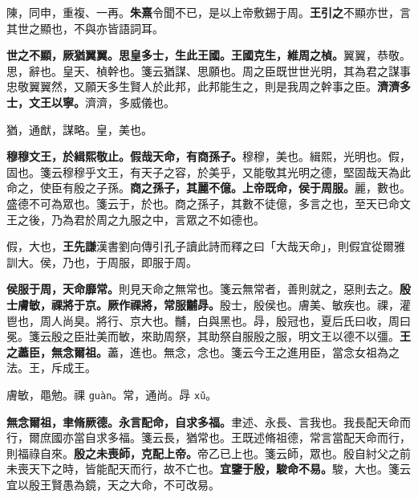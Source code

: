 \begin{quoting}陳，同申，重複、一再。\textbf{朱熹}令聞不已，是以上帝敷錫于周。\textbf{王引之}不顯亦世，言其世之顯也，不與亦皆語詞耳。\end{quoting}

\textbf{世之不顯，厥猶翼翼。思皇多士，生此王國。王國克生，維周之楨。}{\footnotesize 翼翼，恭敬。思，辭也。皇天、楨幹也。箋云猶謀、思願也。周之臣既世世光明，其為君之謀事忠敬翼翼然，又願天多生賢人於此邦，此邦能生之，則是我周之幹事之臣。}\textbf{濟濟多士，文王以寧。}{\footnotesize 濟濟，多威儀也。}

\begin{quoting}猶，通猷，謀略。皇，美也。\end{quoting}

\textbf{穆穆文王，於緝熙敬止。假哉天命，有商孫子。}{\footnotesize 穆穆，美也。緝熙，光明也。假，固也。箋云穆穆乎文王，有天子之容，於美乎，又能敬其光明之德，堅固哉天為此命之，使臣有殷之子孫。}\textbf{商之孫子，其麗不億。上帝既命，侯于周服。}{\footnotesize 麗，數也。盛德不可為眾也。箋云于，於也。商之孫子，其數不徒億，多言之也，至天已命文王之後，乃為君於周之九服之中，言眾之不如德也。}

\begin{quoting}假，大也，\textbf{王先謙}漢書劉向傳引孔子讀此詩而釋之曰「大哉天命」，則假宜從爾雅訓大。侯，乃也，于周服，即服于周。\end{quoting}

\textbf{侯服于周，天命靡常。}{\footnotesize 則見天命之無常也。箋云無常者，善則就之，惡則去之。}\textbf{殷士膚敏，祼將于京。厥作祼將，常服黼冔。}{\footnotesize 殷士，殷侯也。膚美、敏疾也。祼，灌鬯也，周人尚臭。將行、京大也。黼，白與黑也。冔，殷冠也，夏后氏曰收，周曰冕。箋云殷之臣壯美而敏，來助周祭，其助祭自服殷之服，明文王以德不以彊。}\textbf{王之藎臣，無念爾祖。}{\footnotesize 藎，進也。無念，念也。箋云今王之進用臣，當念女祖為之法。王，斥成王。}

\begin{quoting}膚敏，黽勉。祼 \texttt{guàn}。常，通尚。冔 \texttt{xǔ}。\end{quoting}

\textbf{無念爾祖，聿脩厥德。永言配命，自求多福。}{\footnotesize 聿述、永長、言我也。我長配天命而行，爾庶國亦當自求多福。箋云長，猶常也。王既述脩祖德，常言當配天命而行，則福祿自來。}\textbf{殷之未喪師，克配上帝。}{\footnotesize 帝乙已上也。箋云師，眾也。殷自紂父之前未喪天下之時，皆能配天而行，故不亡也。}\textbf{宜鑒于殷，駿命不易。}{\footnotesize 駿，大也。箋云宜以殷王賢愚為鏡，天之大命，不可改易。}

